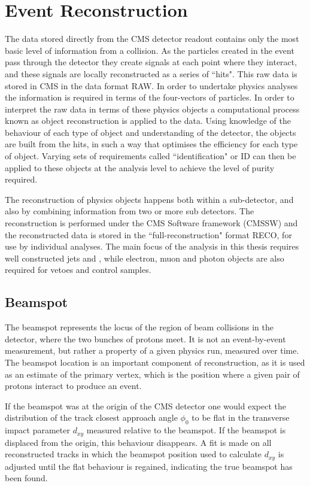\chapter{Event Reconstruction}
\label{ch:objects}
The data stored directly from the CMS detector readout contains only the most basic level of information from a collision. As the particles created in the event pass through the detector they create signals at each point where they interact, and these signals are locally reconstructed as a series of ``hits". This raw data is stored in CMS in the data format RAW. In order to undertake physics analyses the information is required in terms of the four-vectors of particles. In order to interpret the raw data in terms of these physics objects a computational process known as object reconstruction is applied to the data. Using knowledge of the behaviour of each type of object and understanding of the detector, the objects are built from the hits, in such a way that optimises the efficiency for each type of object. Varying sets of requirements called ``identification" or ID can then be applied to these objects at the analysis level to achieve the level of purity required. 

The reconstruction of physics objects happens both within a sub-detector, and also by combining information from two or more sub detectors. The reconstruction is performed under the CMS Software framework (CMSSW) and the reconstructed data is stored in the ``full-reconstruction" format RECO, for use by individual analyses. The main focus of the analysis in this thesis requires well constructed jets and \met, while electron, muon and photon objects are also required for vetoes and control samples. 

\section{Beamspot}

The beamspot represents the locus of the region of beam collisions in the detector, where the two bunches of protons meet. It is not an event-by-event measurement, but rather a property of a given physics run, measured over time. The beamspot location is an important component of reconstruction, as it is used as an estimate of the primary vertex, which is the position where a given pair of  protons interact to produce an event.

If the beamspot was at the origin of the CMS detector one would expect the distribution of the track closest approach angle $\phi_{0}$ to be flat in the transverse impact parameter $d_{xy}$ measured relative to the beamspot. If the beamspot is displaced from the origin, this behaviour disappears. A fit is made on all reconstructed tracks in which the beamspot position used to calculate $d_{xy}$ is adjusted until the flat behaviour is regained, indicating the true beamspot has been found. 
 

